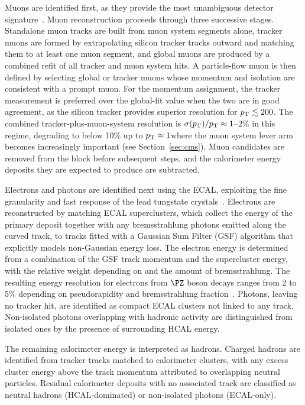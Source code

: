 Muons are identified first, as they provide the most unambiguous detector signature~\cite{CMS:2018rym}. Muon reconstruction proceeds through three successive stages. Standalone muon tracks are built from muon system segments alone, tracker muons are formed by extrapolating silicon tracker tracks outward and matching them to at least one muon segment, and global muons are produced by a combined refit of all tracker and muon system hits. A particle-flow muon is then defined by selecting global or tracker muons whose momentum and isolation are consistent with a prompt muon. For the momentum assignment, the tracker measurement is preferred over the global-fit value when the two are in good agreement, as the silicon tracker provides superior resolution for $p_{\mathrm{T}} \lesssim 200$\GeV. The combined tracker-plus-muon-system resolution is $\sigma(p_{\mathrm{T}})/p_{\mathrm{T}} \approx 1$--$2\%$ in this regime, degrading to below 10\% up to $p_{\mathrm{T}} \approx 1$\TeV where the muon system lever arm becomes increasingly important (see Section~\ref{sec:cms}). Muon candidates are removed from the block before subsequent steps, and the calorimeter energy deposits they are expected to produce are subtracted.

Electrons and photons are identified next using the ECAL, exploiting the fine granularity and fast response of the lead tungstate crystals~\cite{CMS:2020uim}. Electrons are reconstructed by matching ECAL superclusters, which collect the energy of the primary deposit together with any bremsstrahlung photons emitted along the curved track, to tracks fitted with a Gaussian Sum Filter (GSF) algorithm that explicitly models non-Gaussian energy loss. The electron energy is determined from a combination of the GSF track momentum and the supercluster energy, with the relative weight depending on \pT and the amount of bremsstrahlung. The resulting energy resolution for electrons from $\PZ$ boson decays ranges from 2 to 5\% depending on pseudorapidity and bremsstrahlung fraction~\cite{CMS:2020uim}. Photons, leaving no tracker hit, are identified as compact ECAL clusters not linked to any track. Non-isolated photons overlapping with hadronic activity are distinguished from isolated ones by the presence of surrounding HCAL energy.

The remaining calorimeter energy is interpreted as hadrons. Charged hadrons are identified from tracker tracks matched to calorimeter clusters, with any excess cluster energy above the track momentum attributed to overlapping neutral particles. Residual calorimeter deposits with no associated track are classified as neutral hadrons (HCAL-dominated) or non-isolated photons (ECAL-only).

